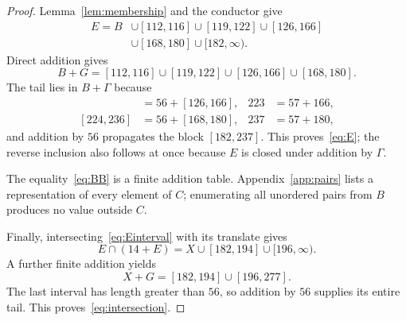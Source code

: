 \documentclass[10pt,a4paper]{amsart}
\begin{document}
\begin{proof}
Lemma~\ref{lem:membership} and the conductor give
\begin{equation}\label{eq:Einterval}
\begin{split}
E=B&\cup[112,116]\cup[119,122]\cup[126,166]\\
 &\cup[168,180]\cup[182,\infty).
\end{split}
\end{equation}
Direct addition gives
\[
 B+G=[112,116]\cup[119,122]\cup[126,166]\cup[168,180].
\]
The tail lies in $B+\Gamma$ because
\begin{align*}
 [182,222]&=56+[126,166],&223&=57+166,\\
 [224,236]&=56+[168,180],&237&=57+180,
\end{align*}
and addition by $56$ propagates the block $[182,237]$. This proves~\eqref{eq:E}; the reverse inclusion also follows at once because $E$ is closed under addition by $\Gamma$.

The equality~\eqref{eq:BB} is a finite addition table. Appendix~\ref{app:pairs} lists a representation of every element of $C$; enumerating all unordered pairs from $B$ produces no value outside $C$.

Finally, intersecting~\eqref{eq:Einterval} with its translate gives
\[
 E\cap(14+E)=X\cup[182,194]\cup[196,\infty).
\]
A further finite addition yields
\[
 X+G=[182,194]\cup[196,277].
\]
The last interval has length greater than $56$, so addition by $56$ supplies its entire tail. This proves~\eqref{eq:intersection}.
\end{proof}
\end{document}
